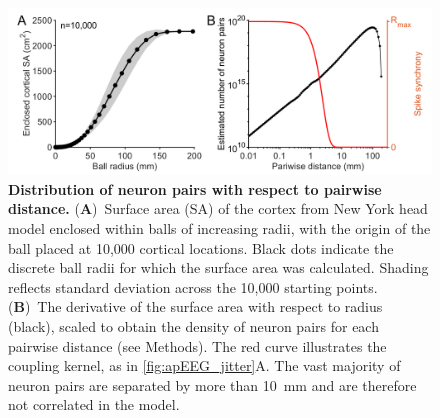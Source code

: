 \begin{figure}[h!]
    \centering
    \includegraphics[width=13.2cm]{Figures/chapter3/figureS4.png}
    \caption[Distribution of neuron pairs with respect to pairwise distance]{\textbf{Distribution of neuron pairs with respect to pairwise distance.} (\textbf{A})~Surface area (SA) of the cortex from New York head model enclosed within balls of increasing radii, with the origin of the ball placed at 10,000 cortical locations. Black dots indicate the discrete ball radii for which the surface area was calculated. Shading reflects standard deviation across the 10,000 starting points. (\textbf{B})~The derivative of the surface area with respect to radius (black), scaled to obtain the density of neuron pairs for each pairwise distance (see Methods). The red curve illustrates the coupling kernel, as in {\autoref{fig:apEEG_jitter}A}. The vast majority of neuron pairs are separated by more than 10~\unit{\milli\meter} and are therefore not correlated in the model.} 
    \label{fig:counting_pairwise}
\end{figure}

\clearpage

